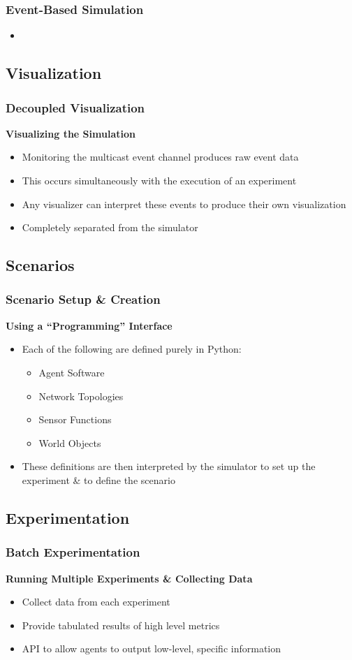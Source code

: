 \documentclass[mathserif]{beamer}
\begin{document}
\frame
{
    \frametitle{Event-Based Simulation}
    \textbf{}
    \begin{itemize}
        \item
    \end{itemize}
}


\subsection{Visualization}
\frame
{
    \frametitle{Decoupled Visualization}
    \textbf{Visualizing the Simulation}
    \begin{itemize}
        \item Monitoring the multicast event channel produces raw event data
        \item This occurs simultaneously with the execution of an experiment
        \item Any visualizer can interpret these events to produce their own visualization
        \item Completely separated from the simulator
    \end{itemize}
}

\subsection{Scenarios}
\frame
{
    \frametitle{Scenario Setup \& Creation}
    \textbf{Using a ``Programming'' Interface}
    \begin{itemize}
        \item Each of the following are defined purely in Python:
        \begin{itemize}
            \item Agent Software
            \item Network Topologies
            \item Sensor Functions
            \item World Objects
        \end{itemize}
        \item These definitions are then interpreted by the simulator to set up the experiment \& to define the scenario
    \end{itemize}

}


\subsection{Experimentation}
\frame
{
    \frametitle{Batch Experimentation}
    \textbf{Running Multiple Experiments \& Collecting Data}
    \begin{itemize}
        \item Collect data from each experiment
        \item Provide tabulated results of high level metrics
        \item API to allow agents to output low-level, specific information
    \end{itemize}
}
\end{document}
